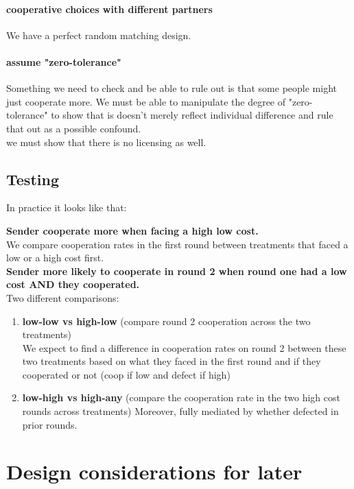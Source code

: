 \documentclass[11pt]{article}
\theoremstyle{plainCl1}
\begin{document}
\paragraph{cooperative choices with different partners}
We have a perfect random matching design. 

\paragraph{assume "zero-tolerance" }
Something we need to check and be able to rule out is that some people might just cooperate more. 
We must be able to manipulate the degree of "zero-tolerance" to show that is doesn't merely reflect individual difference and rule that out as a possible confound. \\
we must show that there is no licensing as well. 

\subsection{Testing}

In practice it looks like that:

\noindent
\textbf{Sender cooperate more when facing a high low cost.} \\
We compare cooperation rates in the first round between treatments that faced a low or a high cost first. \\

\noindent
\textbf{Sender more likely to cooperate in round 2 when round one had a low cost AND they cooperated.} \\
Two different comparisons:
\begin{enumerate}
    \item \textbf{low-low vs high-low} (compare round 2 cooperation across the two treatments)\\ 
    		We expect to find a difference in cooperation rates on round 2 between these two treatments based on what they faced in the first round and if they cooperated or not (coop if low 			and defect if high)
    \item \textbf{low-high vs high-any} (compare the cooperation rate in the two high cost rounds across treatments)
    		Moreover, fully mediated by whether defected in prior rounds. 
\end{enumerate}


\section{Design considerations for later}
\end{document}
